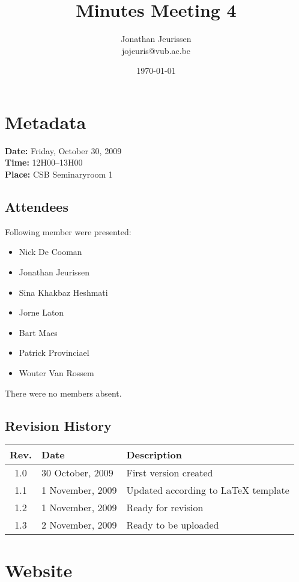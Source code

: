 \documentclass[a4paper, 12pt]{article}
\begin{document}
\title{Minutes Meeting 4}
\author{Jonathan Jeurissen \\ jojeuris@vub.ac.be}
\date{\today}

\maketitle	
	\section{Metadata}
			\textbf{Date:} Friday, October 30, 2009\\
			\textbf{Time:} 12H00--13H00\\
			\textbf{Place:} CSB Seminaryroom 1\\
		\subsection{Attendees}
Following member were presented:
			\begin{itemize}
				\item Nick De Cooman
				\item Jonathan Jeurissen
				\item Sina Khakbaz Heshmati
				\item Jorne Laton
				\item Bart Maes
				\item Patrick Provinciael
				\item Wouter Van Rossem
			\end{itemize}
There were no members absent.
		\subsection{Revision History}
			\begin{tabular}{c | l | l }
				\textbf{Rev.} & \textbf{Date} & \textbf{Description} \\
				\hline
				1.0 & 30 October, 2009 & First version created \\
				1.1 & 1 November, 2009 & Updated according to \LaTeX{} template \\
				1.2 & 1 November, 2009 & Ready for revision \\
				1.3 & 2 November, 2009 & Ready to be uploaded \\
			\end{tabular}		
	
	\section{Website}
	
\end{document}

